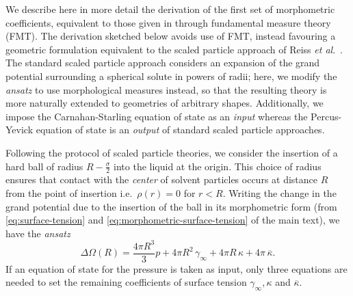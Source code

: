 \documentclass[11pt]{report}
\begin{document}
We describe here in more detail the derivation of the first set of morphometric coefficients, equivalent to those given in \cite{Hansen-Goos2006} through fundamental measure theory (FMT).
The derivation sketched below avoids use of FMT, instead favouring a geometric formulation equivalent to the scaled particle approach of Reiss \emph{et al}.\ \cite{Reiss1959,Reiss1960}.
The standard scaled particle approach considers an expansion of the grand potential surrounding a spherical solute in powers of radii; here, we modify the \emph{ansatz} to use morphological measures instead, so that the resulting theory is more naturally extended to geometries of arbitrary shapes.
Additionally, we impose the Carnahan-Starling equation of state as an \emph{input} whereas the Percus-Yevick equation of state is an \textit{output} of standard scaled particle approaches.

Following the protocol of scaled particle theories, we consider the insertion of a hard ball of radius $R-\frac{\sigma}{2}$ into the liquid at the origin.
This choice of radius ensures that contact with the \emph{center} of solvent particles occurs at distance $R$ from the point of insertion i.e.\ $\rho(r) = 0$ for $r < R$.
Writing the change in the grand potential due to the insertion of the ball in its morphometric form (from \eqref{eq:surface-tension} and \eqref{eq:morphometric-surface-tension} of the main text), we have the \emph{ansatz}
\begin{equation}\label{eq:morph-ball-solvation}
  \Delta \Omega(R) =
  \frac{4\pi R^3}{3} p +
  4\pi R^2 \, \gamma_\infty +
  4\pi R \, \kappa +
  4 \pi \, \overline{\kappa}.
\end{equation}
If an equation of state for the pressure is taken as input, only three equations are needed to set the remaining coefficients of surface tension $\gamma_\infty, \kappa$ and $\overline{\kappa}$.
\end{document}
